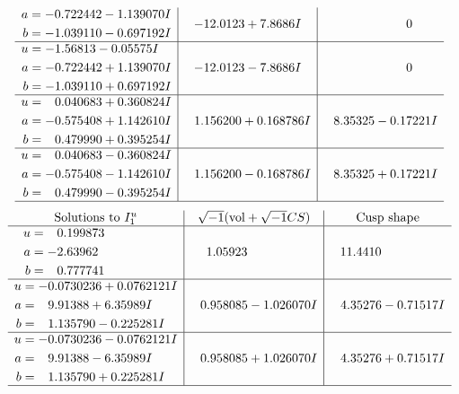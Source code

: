 \documentclass[1p]{elsarticle_modified}
\theoremstyle{definition}
\newcommand{\I}{\sqrt{-1}}
\begin{document}
$$\begin{array}{c|c|c}
\begin{aligned}
a &= -0.722442 - 1.139070 I \\
b &= -1.039110 - 0.697192 I\end{aligned}
 & -12.0123 + 7.8686 I & \phantom{-0.000000 } 0 \\ \hline\begin{aligned}
u &= -1.56813 - 0.05575 I \\
a &= -0.722442 + 1.139070 I \\
b &= -1.039110 + 0.697192 I\end{aligned}
 & -12.0123 - 7.8686 I & \phantom{-0.000000 } 0 \\ \hline\begin{aligned}
u &= \phantom{-}0.040683 + 0.360824 I \\
a &= -0.575408 + 1.142610 I \\
b &= \phantom{-}0.479990 + 0.395254 I\end{aligned}
 & \phantom{-}1.156200 + 0.168786 I & \phantom{-}8.35325 - 0.17221 I \\ \hline\begin{aligned}
u &= \phantom{-}0.040683 - 0.360824 I \\
a &= -0.575408 - 1.142610 I \\
b &= \phantom{-}0.479990 - 0.395254 I\end{aligned}
 & \phantom{-}1.156200 - 0.168786 I & \phantom{-}8.35325 + 0.17221 I\\
 \hline 
 \end{array}$$\newpage$$\begin{array}{c|c|c}  
\text{Solutions to }I^u_{1}& \I (\text{vol} + \sqrt{-1}CS) & \text{Cusp shape}\\
 \hline 
\begin{aligned}
u &= \phantom{-}0.199873\phantom{ +0.000000I} \\
a &= -2.63962\phantom{ +0.000000I} \\
b &= \phantom{-}0.777741\phantom{ +0.000000I}\end{aligned}
 & \phantom{-}1.05923\phantom{ +0.000000I} & \phantom{-}11.4410\phantom{ +0.000000I} \\ \hline\begin{aligned}
u &= -0.0730236 + 0.0762121 I \\
a &= \phantom{-}9.91388 + 6.35989 I \\
b &= \phantom{-}1.135790 - 0.225281 I\end{aligned}
 & \phantom{-}0.958085 - 1.026070 I & \phantom{-}4.35276 - 0.71517 I \\ \hline\begin{aligned}
u &= -0.0730236 - 0.0762121 I \\
a &= \phantom{-}9.91388 - 6.35989 I \\
b &= \phantom{-}1.135790 + 0.225281 I\end{aligned}
 & \phantom{-}0.958085 + 1.026070 I & \phantom{-}4.35276 + 0.71517 I\\
 \hline 
 \end{array}$$\newpage\newpage\renewcommand{\arraystretch}{1}
\end{document}
